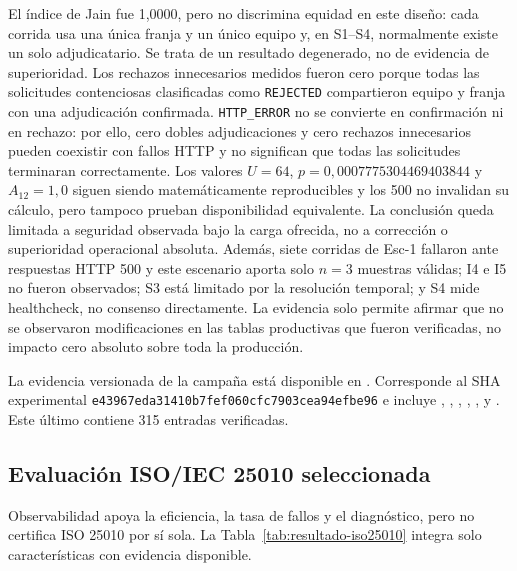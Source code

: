 El índice de Jain fue 1,0000, pero no discrimina equidad en este diseño: cada
corrida usa una única franja y un único equipo y, en S1--S4, normalmente existe
un solo adjudicatario. Se trata de un resultado degenerado, no de evidencia de
superioridad. Los rechazos innecesarios medidos fueron cero porque todas las
solicitudes contenciosas clasificadas como \texttt{REJECTED} compartieron equipo
y franja con una adjudicación confirmada. \texttt{HTTP\_ERROR} no se convierte
en confirmación ni en rechazo: por ello, cero dobles adjudicaciones y cero
rechazos innecesarios pueden coexistir con fallos HTTP y no significan que todas
las solicitudes terminaran correctamente. Los valores $U=64$,
$p=0,0007775304469403844$ y $A_{12}=1,0$ siguen siendo matemáticamente
reproducibles y los 500 no invalidan su cálculo, pero tampoco prueban
disponibilidad equivalente. La conclusión queda limitada a seguridad observada
bajo la carga ofrecida, no a corrección o superioridad operacional absoluta.
Además, siete corridas de Esc-1 fallaron ante respuestas HTTP 500 y este
escenario aporta solo $n=3$ muestras válidas; I4 e I5 no
fueron observados; S3 está limitado por la resolución temporal; y S4 mide
healthcheck, no consenso directamente. La evidencia solo permite afirmar que no
se observaron modificaciones en las tablas productivas que fueron verificadas,
no impacto cero absoluto sobre toda la producción.

La evidencia versionada de la campaña está disponible en
. Corresponde al SHA
experimental \texttt{e43967eda31410b7fef060cfc7903cea94efbe96} e incluye
, ,
, ,
,  y . Este último contiene
315 entradas verificadas.

\subsection{Evaluación ISO/IEC 25010 seleccionada}
\label{subsec:tabla-iso25010}

Observabilidad apoya la eficiencia, la tasa de fallos y el diagnóstico, pero no
certifica ISO 25010 por sí sola. La Tabla~\ref{tab:resultado-iso25010} integra
solo características con evidencia disponible.

